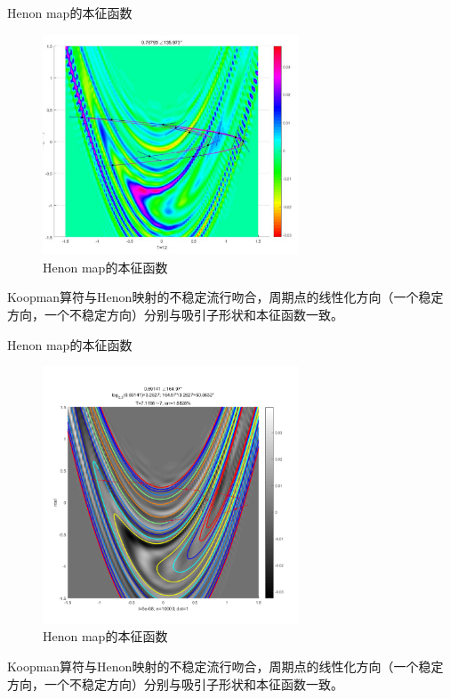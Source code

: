 \documentclass{beamer}
\begin{document}
\begin{frame}{Henon map的本征函数}
	\begin{figure}
		\centering
		\includegraphics[width=3in]{figure/henon_eigen}
		\caption{Henon map的本征函数}
	\end{figure}
	Koopman算符与Henon映射的不稳定流行吻合，周期点的线性化方向（一个稳定方向，一个不稳定方向）分别与吸引子形状和本征函数一致。
\end{frame}

\begin{frame}{Henon map的本征函数}
	\begin{figure}
		\centering
		\includegraphics[width=3in]{figure/henon_evolution}
		\caption{Henon map的本征函数}
	\end{figure}
	Koopman算符与Henon映射的不稳定流行吻合，周期点的线性化方向（一个稳定方向，一个不稳定方向）分别与吸引子形状和本征函数一致。
\end{frame}
\end{document}
